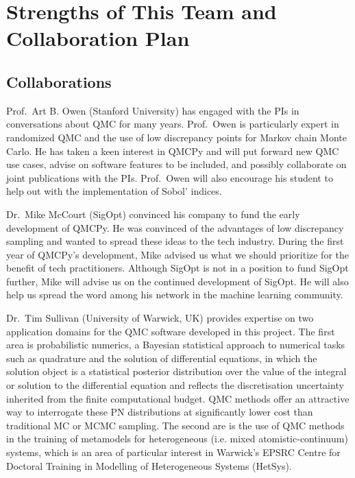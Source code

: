 \documentclass[11pt]{NSFamsart}
\begin{document}
\section{Strengths of This Team and Collaboration Plan}


\subsection{Collaborations}
Prof.\ Art B. Owen (Stanford University) has engaged with the PIs in conversations about QMC for many years.  Prof.\ Owen is particularly expert in randomized QMC and the use of low discrepancy points for Markov chain Monte Carlo.  He has taken a keen interest in QMCPy and will put forward new QMC use cases, advise on software features to be included, and possibly collaborate on joint publications with the PIs.  Prof.\ Owen will also encourage his student to help out with the implementation of Sobol' indices.

Dr.\ Mike McCourt (SigOpt) convinced his company to fund the early development of QMCPy.  He was convinced of the advantages of low discrepancy sampling and wanted to spread these ideas to the tech industry.  During the first year of QMCPy's development, Mike advised us what we should prioritize for the benefit of tech practitioners.  Although SigOpt is not in a position to  fund SigOpt further, Mike will advise us on the continued development of SigOpt.  He will also help us spread the word among his network in the machine learning community.

Dr.\ Tim Sullivan (University of Warwick, UK) provides expertise on two application domains for the QMC software developed in this project.  The first area is probabilistic numerics, a Bayesian statistical approach to numerical tasks such as quadrature and the solution of differential equations, in which the solution object is a statistical posterior distribution over the value of the integral or solution to the differential equation and reflects the discretisation uncertainty inherited from the finite computational budget.  QMC methods offer an attractive way to interrogate these PN distributions at significantly lower cost than traditional MC or MCMC sampling.  The second are is the use of QMC methods in the training of metamodels for heterogeneous (i.e. mixed atomistic-continuum) systems, which is an area of particular interest in Warwick's EPSRC Centre for Doctoral Training in Modelling of Heterogeneous Systems (HetSys).




\newpage
\clearpage
\setcounter{page}{1}




{\renewcommand\addcontentsline[3]{} 
\renewcommand{\refname}{{\Large\textbf{References Cited}}}                   %
\renewcommand{\bibliofont}{\normalsize}

}
\end{document}
